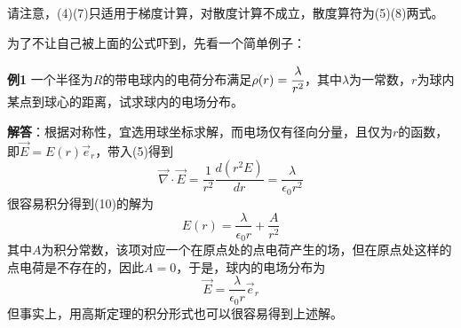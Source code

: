 \documentclass[a4paper,10pt]{ctexart}
\begin{document}
请注意，(4)(7)只适用于梯度计算，对散度计算不成立，散度算符为(5)(8)两式。
\par
为了不让自己被上面的公式吓到，先看一个简单例子：\par
\textbf{例1} 一个半径为$R$的带电球内的电荷分布满足$\rho (r) = \cfrac{\lambda}{r^2}$，其中$\lambda$为一常数，$r$为球内某点到球心的距离，试求球内的电场分布。
\par
\textbf{解答}：根据对称性，宜选用球坐标求解，而电场仅有径向分量，且仅为$r$的函数，即$\vec{E} = E(r) \vec{e}_r$，带入(5)得到
\begin{equation}
\vec{\nabla} \cdot \vec{E} = \frac{1}{r^2} \frac{d(r^2 E)}{dr} = \frac{\lambda}{\epsilon_0 r^2}
\end{equation}
很容易积分得到(10)的解为
\begin{equation}
E(r) = \frac{\lambda}{\epsilon_0 r} +\frac{A}{r^2}
\end{equation}
其中$A$为积分常数，该项对应一个在原点处的点电荷产生的场，但在原点处这样的点电荷是不存在的，因此$A = 0$，于是，球内的电场分布为
\begin{equation}
\vec{E} = \frac{\lambda}{\epsilon_0 r} \vec{e}_r
\end{equation}
但事实上，用高斯定理的积分形式也可以很容易得到上述解。
\end{document}
